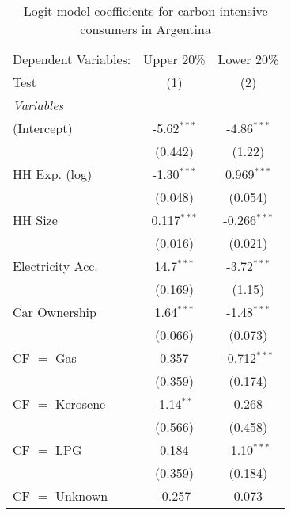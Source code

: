 
\begin{table}[htbp!]
   \centering
   \small
   \begin{adjustbox}{width = 1\textwidth, max height = 0.95\textheight, center}
      \begin{threeparttable}[b]
         \caption{\label{tab:Logit_1_ARG} Logit-model coefficients for carbon-intensive consumers in Argentina}
         \begin{tabular}{lcc}
            \tabularnewline \midrule \midrule
            Dependent Variables: & Upper 20\%     & Lower 20\%\\   
            Test                 & (1)            & (2)\\  
            \midrule
            \emph{Variables}\\
            (Intercept)          & -5.62$^{***}$  & -4.86$^{***}$\\   
                                 & (0.442)        & (1.22)\\   
            HH Exp. (log)        & -1.30$^{***}$  & 0.969$^{***}$\\   
                                 & (0.048)        & (0.054)\\   
            HH Size              & 0.117$^{***}$  & -0.266$^{***}$\\   
                                 & (0.016)        & (0.021)\\   
            Electricity Acc.     & 14.7$^{***}$   & -3.72$^{***}$\\   
                                 & (0.169)        & (1.15)\\   
            Car Ownership        & 1.64$^{***}$   & -1.48$^{***}$\\   
                                 & (0.066)        & (0.073)\\   
            CF $=$ Gas           & 0.357          & -0.712$^{***}$\\   
                                 & (0.359)        & (0.174)\\   
            CF $=$ Kerosene      & -1.14$^{**}$   & 0.268\\   
                                 & (0.566)        & (0.458)\\   
            CF $=$ LPG           & 0.184          & -1.10$^{***}$\\   
                                 & (0.359)        & (0.184)\\   
            CF $=$ Unknown       & -0.257         & 0.073\\   

\end{tabular}
\end{threeparttable}
\end{adjustbox}
\end{table}
